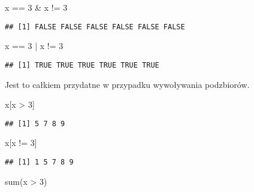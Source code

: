 \documentclass[
]{article}
\newenvironment{Shaded}{\begin{snugshade}}{\end{snugshade}}
\newcommand{\DecValTok}[1]{\textcolor[rgb]{0.00,0.00,0.81}{#1}}
\newcommand{\FunctionTok}[1]{\textcolor[rgb]{0.00,0.00,0.00}{#1}}
\newcommand{\NormalTok}[1]{#1}
\newcommand{\SpecialCharTok}[1]{\textcolor[rgb]{0.00,0.00,0.00}{#1}}
\begin{document}
\begin{Shaded}
\begin{Highlighting}[]
\NormalTok{x }\SpecialCharTok{==} \DecValTok{3} \SpecialCharTok{\&}\NormalTok{ x }\SpecialCharTok{!=} \DecValTok{3}
\end{Highlighting}
\end{Shaded}

\begin{verbatim}
## [1] FALSE FALSE FALSE FALSE FALSE FALSE
\end{verbatim}

\begin{Shaded}
\begin{Highlighting}[]
\NormalTok{x }\SpecialCharTok{==} \DecValTok{3} \SpecialCharTok{|}\NormalTok{ x }\SpecialCharTok{!=} \DecValTok{3}
\end{Highlighting}
\end{Shaded}

\begin{verbatim}
## [1] TRUE TRUE TRUE TRUE TRUE TRUE
\end{verbatim}

Jest to całkiem przydatne w przypadku wywoływania podzbiorów.

\begin{Shaded}
\begin{Highlighting}[]
\NormalTok{x[x }\SpecialCharTok{\textgreater{}} \DecValTok{3}\NormalTok{]}
\end{Highlighting}
\end{Shaded}

\begin{verbatim}
## [1] 5 7 8 9
\end{verbatim}

\begin{Shaded}
\begin{Highlighting}[]
\NormalTok{x[x }\SpecialCharTok{!=} \DecValTok{3}\NormalTok{]}
\end{Highlighting}
\end{Shaded}

\begin{verbatim}
## [1] 1 5 7 8 9
\end{verbatim}

\begin{Shaded}
\begin{Highlighting}[]
\FunctionTok{sum}\NormalTok{(x }\SpecialCharTok{\textgreater{}} \DecValTok{3}\NormalTok{)}
\end{Highlighting}
\end{Shaded}
\end{document}
